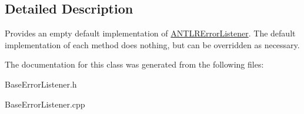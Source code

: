\subsection{Detailed Description}
Provides an empty default implementation of \hyperlink{classantlr4_1_1ANTLRErrorListener}{A\+N\+T\+L\+R\+Error\+Listener}. The default implementation of each method does nothing, but can be overridden as necessary. 

The documentation for this class was generated from the following files\+:\begin{DoxyCompactItemize}
\item 
Base\+Error\+Listener.\+h\item 
Base\+Error\+Listener.\+cpp\end{DoxyCompactItemize}
